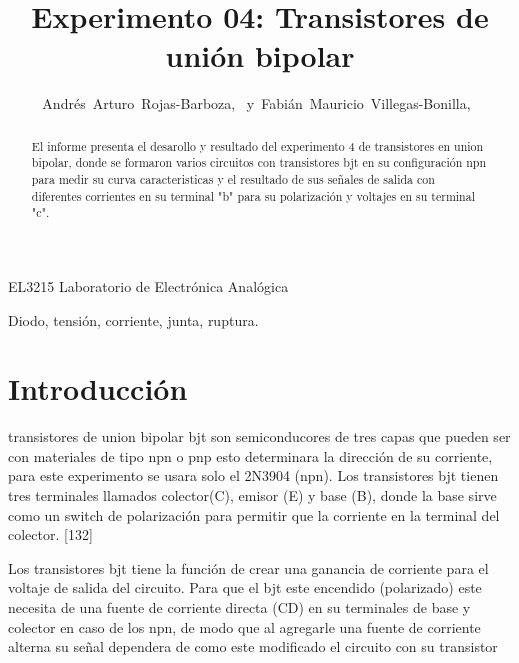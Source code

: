 \documentclass[journal]{IEEEtran}
\begin{document}
\title{Experimento 04: Transistores de unión bipolar}


\author{Andrés~Arturo~Rojas-Barboza,~
        y~Fabián~Mauricio~Villegas-Bonilla,~
}


%
{EL3215 Laboratorio de Electrónica Analógica}


\maketitle


\begin{abstract}
El informe presenta el desarollo y resultado del experimento 4 de transistores en union bipolar, donde se formaron varios circuitos con transistores bjt en su configuración npn para medir su curva caracteristicas y el resultado de sus señales de salida con diferentes corrientes en su terminal "b" para su polarización y voltajes en su terminal "c".
\end{abstract}

\begin{IEEEkeywords}
Diodo, tensión, corriente, junta, ruptura.
\end{IEEEkeywords}


\section{Introducción}

 transistores de union bipolar bjt son semiconducores de tres capas que pueden ser con materiales de tipo npn o pnp esto determinara la dirección de su corriente, para este experimento se usara solo el 2N3904 (npn). Los transistores bjt tienen tres terminales llamados colector(C), emisor (E) y base (B), donde la base sirve como un switch de polarización para permitir que la corriente en la terminal del colector. [132]

Los transistores bjt tiene la función de crear una ganancia de corriente para el voltaje de salida del circuito. Para que el bjt este encendido (polarizado) este necesita de una fuente de corriente directa (CD) en su terminales de base y colector en caso de los npn, de modo que al agregarle una fuente de corriente alterna su señal dependera de como este modificado el circuito con su transistor
\end{document}
